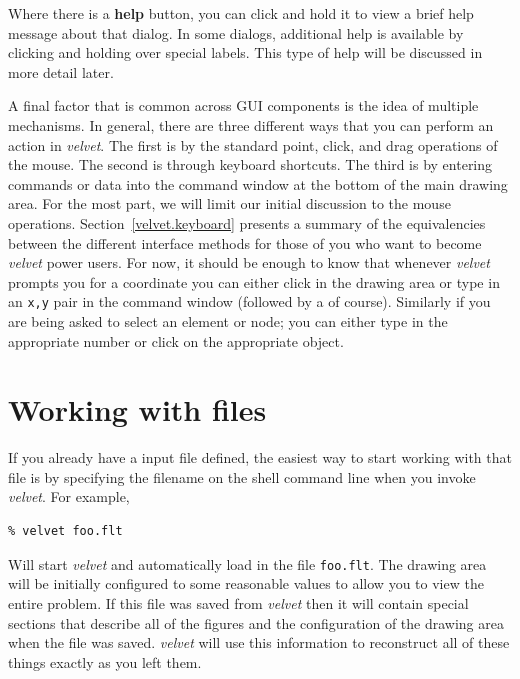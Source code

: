 Where there is a {\bf help} button, you can click and hold it to view
a brief help message about that dialog.  In some dialogs, additional help is 
available by clicking and holding over special labels.  This type of
help will be discussed in more detail later.

A final factor that is common across GUI components is the idea of multiple
mechanisms.  In general, there are three different ways that you can
perform an action in {\em velvet}.  The first is by the standard
point, click, and drag operations of the mouse.  The second is through 
keyboard shortcuts.  The third is by entering commands or data into
the command window at the bottom of the main drawing area.  For the most
part, we will limit our initial discussion to the mouse operations.
Section~\ref{velvet.keyboard} presents a summary of the equivalencies
between the different interface methods for those of you who want to 
become {\em velvet} power users.  For now, it should be enough to know
that whenever {\em velvet} prompts you for a coordinate you can
either click in the drawing area or type in an {\tt x,y} pair in the
command window (followed by a  of course). 
Similarly if you are being asked to select an element
or node; you can either type in the appropriate number or click on 
the appropriate object.

\section{Working with files}

If you already have a \felt{} input file defined, the easiest way to
start working with that file is by specifying the filename on the 
shell command line when you invoke {\em velvet}.  For example, 
\begin{screen}
 \begin{verbatim}
% velvet foo.flt
 \end{verbatim}
\end{screen}
Will start {\em velvet} and automatically load in the file {\tt foo.flt}.
The drawing area will be initially configured to some reasonable
values to allow you to view the entire problem.  If this file was
saved from {\em velvet} then it will contain special sections that describe
all of the figures and the configuration of the drawing area when the file
was saved.  {\em velvet} will use this information to reconstruct all of
these things exactly as you left them.

